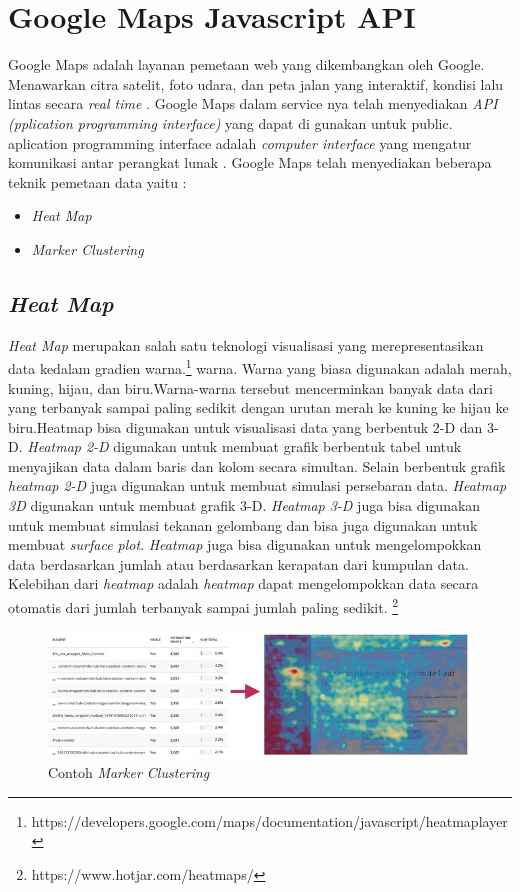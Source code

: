 \section{Google Maps Javascript API}
\label{sec:googlemaps}
Google Maps adalah layanan pemetaan web yang dikembangkan oleh Google. Menawarkan citra satelit, foto udara, dan peta jalan yang interaktif, kondisi lalu lintas secara \textit{real time} \cite{mehta:19:gmaps}.
Google Maps dalam service nya telah menyediakan \textit{API (pplication programming interface)} yang dapat di gunakan untuk public.
aplication programming interface adalah \textit{computer interface} yang mengatur komunikasi antar perangkat lunak \cite{libby:20:api}.
Google Maps telah menyediakan beberapa teknik pemetaan data yaitu :
 \begin{itemize}
     \item \textit{Heat Map}
     \item \textit{Marker Clustering}

 \end{itemize}
 \subsection{\textit{Heat Map}}
 \label{subsec:heat map}
 \textit{Heat Map} merupakan salah satu teknologi visualisasi yang merepresentasikan data kedalam gradien warna.\footnote{https://developers.google.com/maps/documentation/javascript/heatmaplayer} warna. Warna yang biasa digunakan adalah merah, kuning, hijau, dan biru.Warna-warna tersebut mencerminkan banyak data dari yang terbanyak sampai paling sedikit dengan urutan merah ke kuning ke hijau ke biru.Heatmap bisa digunakan untuk visualisasi data yang berbentuk 2-D dan 3-D.
 \textit{Heatmap 2-D} digunakan untuk membuat grafik berbentuk tabel untuk menyajikan data dalam baris dan kolom secara simultan. Selain berbentuk grafik \textit{heatmap 2-D} juga digunakan untuk membuat simulasi persebaran data. \textit{Heatmap 3D} digunakan untuk membuat grafik 3-D. \textit{Heatmap 3-D} juga bisa digunakan untuk membuat simulasi tekanan gelombang dan bisa juga digunakan untuk membuat \textit{surface plot}.
 \textit{Heatmap} juga bisa digunakan untuk mengelompokkan data berdasarkan jumlah atau berdasarkan kerapatan dari kumpulan data. Kelebihan dari \textit{heatmap} adalah \textit{heatmap} dapat mengelompokkan data secara otomatis dari jumlah terbanyak sampai jumlah paling sedikit.  \footnote{https://www.hotjar.com/heatmaps/}
 
 \begin{figure}[H]
    \centering
    \includegraphics[scale=0.5]{Gambar/Heatmap-data-visualization.width-750.jpg}
    \caption{Contoh \textit{Marker Clustering}}
    \label{fig:my_label}
\end{figure}


